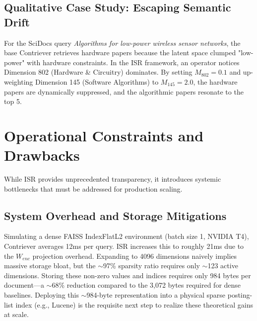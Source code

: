 \documentclass[sigconf,authordraft]{acmart}
\begin{document}
\begin{table}[htbp]
\centering
\caption{Ablation Study on ISR Components (SciDocs)}
\label{tab:ablation}
\end{table}

\subsection{Qualitative Case Study: Escaping Semantic Drift}
For the SciDocs query \textit{Algorithms for low-power wireless sensor networks}, the base Contriever retrieves hardware papers because the latent space clumped "low-power" with hardware constraints. In the ISR framework, an operator notices Dimension 802 (Hardware \& Circuitry) dominates. By setting $M_{802}=0.1$ and up-weighting Dimension 145 (Software Algorithms) to $M_{145}=2.0$, the hardware papers are dynamically suppressed, and the algorithmic papers resonate to the top 5.

\section{Operational Constraints and Drawbacks}
While ISR provides unprecedented transparency, it introduces systemic bottlenecks that must be addressed for production scaling.

\subsection{System Overhead and Storage Mitigations}
Simulating a dense FAISS \cite{johnson2019} IndexFlatL2 environment (batch size 1, NVIDIA T4), Contriever averages 12ms per query. ISR increases this to roughly 21ms due to the $W_{enc}$ projection overhead. Expanding to 4096 dimensions naively implies massive storage bloat, but the $\sim$97\% sparsity ratio requires only $\sim$123 active dimensions. Storing these non-zero values and indices requires only 984 bytes per document—a $\sim$68\% reduction compared to the 3,072 bytes required for dense baselines. Deploying this $\sim$984-byte representation into a physical sparse posting-list index (e.g., Lucene) is the requisite next step to realize these theoretical gains at scale.
\end{document}
